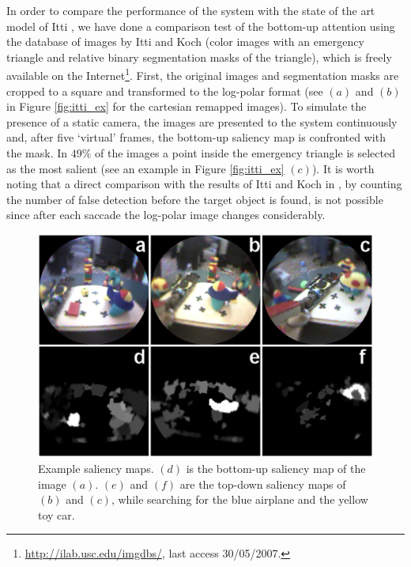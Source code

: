 \documentclass{llncs}
\begin{document}
In order to compare the performance of the system
with the state of the art model of Itti \cite{IttiKN98}, we
have done a comparison test of the bottom-up attention
using the database of images by Itti and Koch \cite{IttiK01b} (color
images with an emergency triangle and relative binary
segmentation masks of the triangle), which is freely
available on the Internet\footnote{\url{http://ilab.usc.edu/imgdbs/}, last access 30/05/2007.}.
First, the original images and segmentation masks are
cropped to a square and transformed to the log-polar
format (see $(a)$ and $(b)$ in Figure \ref{fig:itti_ex}
for the cartesian remapped images). To simulate the
presence of a static camera, the images are presented to
the system continuously and, after five `virtual'
frames, the bottom-up saliency map is confronted with
the mask. In $49\%$ of the images a point inside the
emergency triangle is selected as the most salient
(see an example in Figure \ref{fig:itti_ex} $(c)$). It is worth noting that a
direct comparison with the results of Itti and Koch in \cite{IttiK01b}, by
counting the number of false detection before the
target object is found, is not possible since after each
saccade the log-polar image changes considerably.


\begin{figure}[!h]
  \begin{center}
    \includegraphics[width=0.9\linewidth]{./figs/attention/a4}
    \caption{Example saliency maps. $(d)$ is the 
     bottom-up saliency map of the image $(a)$. $(e)$ and $(f)$ are the top-down
	   saliency maps of $(b)$ and $(c)$, while searching for the blue airplane and the yellow toy car.}
    \label{fig:out_ex}
  \end{center}
\end{figure}
\end{document}
